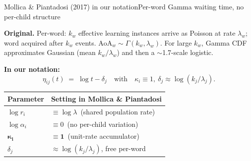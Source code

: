 \documentclass[aspectratio=169,t]{beamer}
\renewcommand{\arraystretch}{1.10}
\begin{document}
\begin{frame}{Mollica \& Piantadosi (2017) in our notation}{Per-word Gamma waiting time, no per-child structure}

\small
\textbf{Original.} Per-word: $k_w$ effective learning instances arrive as
Poisson at rate $\lambda_w$; word acquired after $k_w$ events.
$\mathrm{AoA}_w \sim \Gamma(k_w, \lambda_w)$. For large $k_w$, Gamma CDF
approximates Gaussian (mean $k_w/\lambda_w$) and then a $\sim$1.7-scale
logistic.

\vspace{0.6em}
\centering
\textbf{In our notation:}
\[
\eta_{ij}(t) \;=\; \log t - \delta_j
\quad\text{with}\quad \kappa_i \equiv 1,\ \delta_j \approx \log(k_j/\lambda_j).
\]

\vspace{0.4em}
\renewcommand{\arraystretch}{1.20}
\begin{tabular}{@{}ll@{}}
\toprule
\textbf{Parameter} & \textbf{Setting in Mollica \& Piantadosi} \\
\midrule
$\log r_i$         & $\equiv \log \lambda$ \,(shared population rate) \\
$\log\alpha_i$     & $\equiv 0$ \,(no per-child variation) \\
$\boldsymbol{\kappa_i}$ & $\boldsymbol{\equiv 1}$ \,(unit-rate accumulator) \\
$\delta_j$         & $\approx \log(k_j/\lambda_j)$, free per-word \\
\bottomrule
\end{tabular}

\end{frame}
\end{document}
